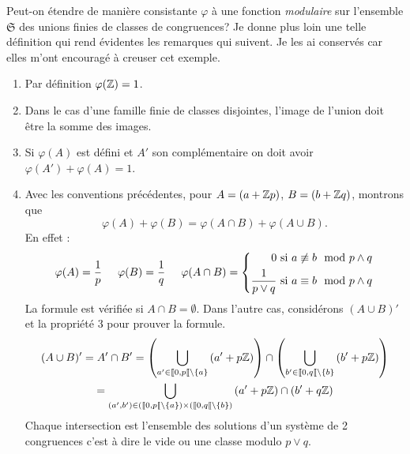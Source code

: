\noindent Peut-on étendre de manière consistante $\varphi$ à une fonction \emph{modulaire} sur l'ensemble $\mathfrak{S}$ des unions finies de classes de congruences?\newline
Je donne plus loin une telle définition qui rend évidentes les remarques qui suivent. Je les ai conservés car elles m'ont encouragé à creuser cet exemple.
\begin{enumerate}
  \item Par définition $\varphi(\mathbb{Z}) = 1$.
  \item Dans le cas d'une famille finie de classes disjointes, l'image de l'union doit être la somme des images.
  \item Si $\varphi(A)$ est défini et $A'$ son complémentaire on doit avoir $\varphi(A') + \varphi(A) = 1$.
  \item Avec les conventions précédentes, pour $A = \left(a + \mathbb{Z} p\right)$, $B = \left(b + \mathbb{Z} q\right)$, montrons que
  \begin{displaymath}
    \varphi(A) + \varphi(B) = \varphi(A\cap B) + \varphi(A \cup B).
  \end{displaymath}
  En effet :
  \begin{displaymath}
    \varphi(A) = \frac{1}{p} \hspace{0.5cm}
    \varphi(B) = \frac{1}{q} \hspace{0.5cm}
    \varphi(A \cap B) =
    \left\lbrace
      \begin{aligned}
        0 &\text{ si } a \not \equiv b \mod p\wedge q\\
        \frac{1}{p\vee q} &\text{ si } a \equiv b \mod p\wedge q
      \end{aligned}
    \right.
  \end{displaymath}
  La formule est vérifiée si $A\cap B = \emptyset$. Dans l'autre cas, considérons $(A\cup B)'$ et la propriété 3 pour prouver la formule.
\begin{multline*}
  (A \cup B)' = A' \cap B'
  =     \left( \bigcup_{a'\in \llbracket 0, p\llbracket \setminus\{a\} } \left(a' + p\mathbb{Z}\right)\right)
   \cap \left( \bigcup_{b'\in \llbracket 0, q\llbracket \setminus\{b\} } \left(b' + p\mathbb{Z}\right)\right) \\
  = \bigcup_{(a',b')\in (\llbracket 0, p\llbracket \setminus\{a\}) \times (\llbracket 0, q\llbracket \setminus\{b\})} \left(a' + p\mathbb{Z}\right)\cap \left(b' + q\mathbb{Z}\right)
\end{multline*}
Chaque intersection est l'ensemble des solutions d'un système de 2 congruences c'est à dire le vide ou une classe modulo $p\vee q$.\newline

\end{enumerate}

